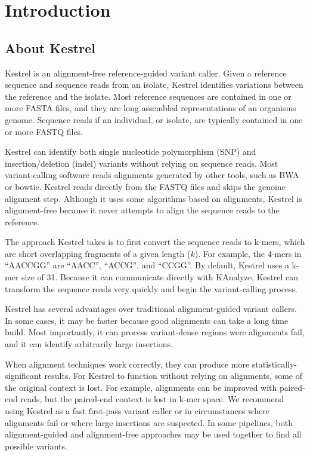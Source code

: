 
\section{Introduction}
\label{sec.intro}

\subsection{About Kestrel}
\label{sec.intro.aboutkestrel}

Kestrel is an alignment-free reference-guided variant caller. Given a reference sequence and sequence reads from an isolate, Kestrel identifies variations between the reference and the isolate. Most reference sequences are contained in one or more FASTA files, and they are long assembled representations of an organisms genome. Sequence reads if an individual, or isolate, are typically contained in one or more FASTQ files.

Kestrel can identify both single nucleotide polymorphism (SNP) and insertion/deletion (indel) variants without relying on sequence reads. Most variant-calling software reads alignments generated by other tools, such as BWA or bowtie. Kestrel reads directly from the FASTQ files and skips the genome alignment step. Although it uses some algorithms based on alignments, Kestrel is alignment-free because it never attempts to align the sequence reads to the reference.

The approach Kestrel takes is to first convert the sequence reads to k-mers, which are short overlapping fragments of a given length ($k$). For example, the 4-mers in ``AACCGG'' are ``AACC'', ``ACCG'', and ``CCGG''. By default, Kestrel uses a k-mer size of 31. Because it can communicate directly with KAnalyze, Kestrel can transform the sequence reads very quickly and begin the variant-calling process.

Kestrel has several advantages over traditional alignment-guided variant callers. In some cases, it may be faster because good alignments can take a long time build. Most importantly, it can process variant-dense regions were alignments fail, and it can identify arbitrarily large insertions.

When alignment techniques work correctly, they can produce more statistically-significant results. For Kestrel to function without relying on alignments, some of the original context is lost. For example, alignments can be improved with paired-end reads, but the paired-end context is lost in k-mer space. We recommend using Kestrel as a fast first-pass variant caller or in circumstances where alignments fail or where large insertions are suspected. In some pipelines, both alignment-guided and alignment-free approaches may be used together to find all possible variants.

